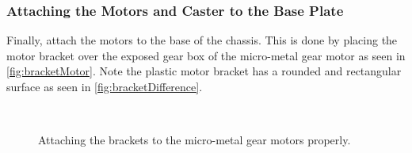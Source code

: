 \subsubsection{Attaching the Motors and Caster to the Base Plate}
\label{sec:baseAssembly}

Finally, attach the motors to the base of the chassis. This is done by placing the motor bracket over the exposed gear box of the micro-metal gear motor as seen in \cref{fig:bracketMotor}. Note the plastic motor bracket has a rounded and rectangular surface as seen in \cref{fig:bracketDifference}. 

\begin{figure}[h!]
\centering
{}
\hfill
{}\\
\caption{Attaching the brackets to the micro-metal gear motors properly.}
\label{fig:properMotorBracket}
\end{figure}

